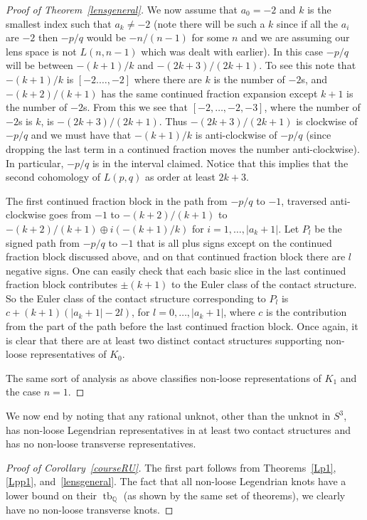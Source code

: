 \documentclass[11pt]{amsart}
\theoremstyle{plain}
\theoremstyle{definition}
\theoremstyle{remark}
\numberwithin{theorem}{section}
\newcommand{\Q}{\mathbb{Q}}           %
\DeclareMathOperator\tb{tb}                   %
\begin{document}
\begin{proof}[Proof of Theorem~\ref{lensgeneral}]
We now assume that $a_0=-2$ and $k$ is the smallest index such that $a_k\not=-2$ (note there will be such a $k$ since if all the $a_i$ are $-2$ then $-p/q$ would be $-n/(n-1)$ for some $n$ and we are assuming our lens space is not $L(n,n-1)$ which was dealt with earlier). In this case $-p/q$ will be between $-(k+1)/k$ and $-(2k+3)/(2k+1)$. To see this note that $-(k+1)/k$ is $[-2.\ldots, -2]$ where there are $k$ is the number of $-2$s, and  $-(k+2)/(k+1)$ has the same continued fraction expansion except $k+1$ is the number of $-2$s. From this we see that $[-2,\ldots, -2,-3]$, where the number of $-2$s is $k$, is $-(2k+3)/(2k+1)$. Thus $-(2k+3)/(2k+1)$ is clockwise of $-p/q$ and we must have that $-(k+1)/k$ is anti-clockwise of $-p/q$ (since dropping the last term in a continued fraction moves the number anti-clockwise). In particular, 
$-p/q$ is in the interval claimed. Notice that this implies that the second cohomology of $L(p,q)$ as order at least $2k+3$. 

The first continued fraction block in the path from $-p/q$ to $-1$, traversed anti-clockwise goes from $-1$ to $-(k+2)/(k+1)$ to $-(k+2)/(k+1)\oplus i(-(k+1)/k)$ for $i=1,\ldots, |a_k+1|$. Let $P_l$ be the signed path from $-p/q$ to $-1$ that is all plus signs except on the continued fraction block discussed above, and on that continued fraction block there are $l$ negative signs. One can easily check that each basic slice in the last continued fraction block contributes $\pm(k+1)$ to the Euler class of the contact structure. So the Euler class of the contact structure corresponding to $P_l$ is $c+(k+1)(|a_k+1|-2l)$, for $l=0, \ldots, |a_k+1|$, where $c$ is the contribution from the part of the path before the last continued fraction block. Once again, it is clear that there are at least two distinct contact structures supporting non-loose representatives of $K_0$. 

The same sort of analysis as above classifies non-loose representations of $K_1$ and the case $n=1$. 
\end{proof}
We now end by noting that any rational unknot, other than the unknot in $S^3$, has non-loose Legendrian representatives in at least two contact structures and has no non-loose transverse representatives. 
\begin{proof}[Proof of Corollary~\ref{courseRU}]
The first part follows from Theorems~\ref{Lp1}, \ref{Lpp1}, and~\ref{lensgeneral}. The fact that all non-loose Legendrian knots have a lower bound on their $\tb_\Q$ (as shown by the same set of theorems), we clearly have no non-loose transverse knots. 
\end{proof}
\end{document}
